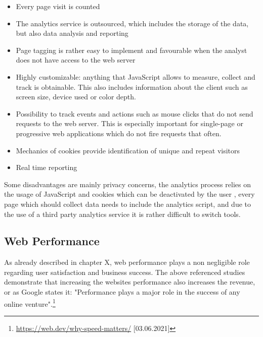 \begin{itemize}
\item Every page visit is counted %
\item The analytics service is outsourced, which includes the storage of the data, but also data analysis and reporting %
\item Page tagging is rather easy to implement and favourable when the analyst does not have access to the web server %
\item Highly customizable: anything that JavaScript allows to measure, collect and track is obtainable. This also includes information about the client such as screen size, device used or color depth. %
\item Possibility to track events and actions such as mouse clicks that do not send requests to the web server. This is especially important for single-page or progressive web applications which do not fire requests that often. %
\item Mechanics of cookies provide identification of unique and repeat visitors %
\item Real time reporting %
\end{itemize}



Some disadvantages are mainly privacy concerns, the analytics process relies on the usage of JavaScript and cookies which can be deactivated by the user %
, every page which should collect data needs to include the analytics script, and due to the use of a third party analytics service it is rather difficult to switch tools. %









\subsection{Web Performance}



As already described in chapter X, web performance plays a non negligible role regarding user satisfaction and business success.
The above referenced studies demonstrate that increasing the websites performance also increases the revenue, or as Google states it: "Performance plays a major role in the success of any online venture".\footnote{\url{https://web.dev/why-speed-matters/} [03.06.2021]}

